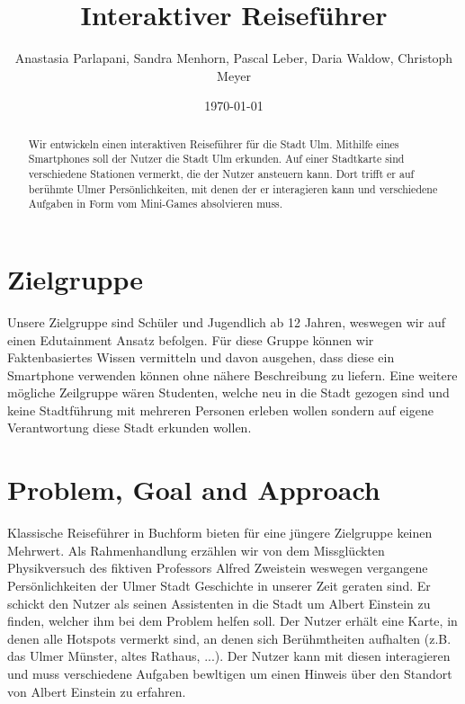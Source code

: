 \documentclass[]{hci-proposal}
\title{Interaktiver Reiseführer}
\author{Anastasia Parlapani, Sandra Menhorn, Pascal Leber, Daria Waldow, Christoph Meyer}
\date{\today}
\begin{document}

\maketitle

\begin{abstract}
  Wir entwickeln einen interaktiven Reiseführer für die Stadt Ulm. Mithilfe eines Smartphones soll
  der Nutzer die Stadt Ulm erkunden. Auf einer Stadtkarte sind verschiedene Stationen vermerkt, die
  der Nutzer ansteuern kann. Dort trifft er auf berühmte Ulmer Persönlichkeiten, mit denen der er
  interagieren kann und verschiedene Aufgaben in Form vom Mini-Games absolvieren muss.



\end{abstract}


\section{Zielgruppe}
Unsere Zielgruppe sind Schüler und Jugendlich ab 12 Jahren, weswegen wir auf einen Edutainment Ansatz befolgen.
Für diese Gruppe können wir Faktenbasiertes Wissen vermitteln und davon ausgehen, dass diese ein Smartphone verwenden können ohne nähere Beschreibung zu liefern.
Eine weitere mögliche Zeilgruppe wären Studenten, welche neu in die Stadt gezogen sind und keine Stadtführung mit mehreren Personen erleben wollen sondern auf eigene Verantwortung diese Stadt erkunden wollen.



\section{Problem, Goal and Approach}
Klassische Reiseführer in Buchform bieten für eine jüngere Zielgruppe keinen Mehrwert.
Als Rahmenhandlung erzählen wir von dem Missglückten Physikversuch des fiktiven Professors Alfred Zweistein weswegen vergangene Persönlichkeiten der Ulmer Stadt Geschichte in unserer Zeit geraten sind.
Er schickt den Nutzer als seinen Assistenten in die Stadt um Albert Einstein zu finden, welcher ihm bei dem Problem helfen soll.
Der Nutzer erhält eine Karte, in denen alle Hotspots vermerkt sind, an denen sich Berühmtheiten aufhalten (z.B. das Ulmer
Münster, altes Rathaus, ...). Der Nutzer kann mit diesen interagieren und muss verschiedene Aufgaben bewltigen um einen
Hinweis über den Standort von Albert Einstein zu erfahren.
\end{document}
